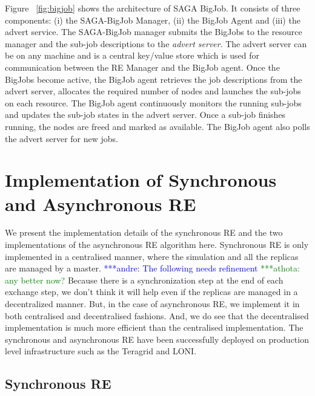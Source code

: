 \documentclass{rspublic}
\newcommand{\alnote}[1]{ {\textcolor{blue} { ***andre: #1 }}}
\newcommand{\athotanote}[1]{ {\textcolor{green} { ***athota: #1 }}}
\newcommand{\alnote}[1]{}
\newcommand{\athotanote}[1]{}
\begin{document}
Figure ~\ref{fig:bigjob} shows the architecture of SAGA BigJob.
It consists of three components: (i) the SAGA-BigJob Manager, (ii) the BigJob Agent and (iii) the advert service. The SAGA-BigJob manager submits the BigJobs to the resource manager and the sub-job descriptions to the \emph{advert server}. The advert server can be on any machine and is a central key/value store which is used for communication between the RE Manager and the BigJob agent. Once the BigJobs become active, the BigJob agent retrieves the job descriptions from the advert server, allocates the required number of nodes and launches the sub-jobs on each resource. The BigJob agent continuously monitors the running sub-jobs and updates the sub-job states in the advert server. Once a sub-job finishes running, the nodes are freed and marked as available. The BigJob agent also polls the advert server for new jobs.


\section{Implementation of Synchronous and Asynchronous RE}
We present the implementation details of the synchronous RE and the two 
implementations of the asynchronous RE algorithm here. Synchronous RE is 
only implemented in a centralised manner, where the simulation and all the 
replicas are managed by a master. 
\alnote{The following needs refinement}\athotanote{any better now?} Because there is a synchronization step at the end of each exchange step, we don't think it will help even if the replicas are managed in a decentralized manner. %
But, in the case of asynchronous RE, we implement it in both 
centralised and decentralised  fashions. And, we do see that the decentralised 
implementation is much more efficient than the centralised implementation.
The synchronous and asynchronous RE have been successfully deployed on production 
level infrastructure such as the Teragrid and LONI. 

\subsection{Synchronous RE}
\end{document}
